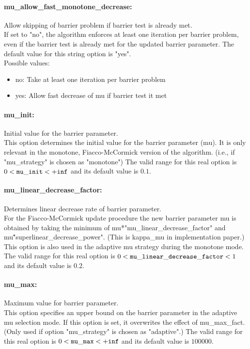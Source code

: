 \paragraph{mu\_allow\_fast\_monotone\_decrease:}\label{sec:mu_allow_fast_monotone_decrease} Allow skipping of barrier problem if barrier test is already met. $\;$ \\
 If set to "no", the algorithm enforces at least
one iteration per barrier problem, even if the
barrier test is already met for the updated
barrier parameter.
The default value for this string option is "yes".
\\ 
Possible values:
\begin{itemize}
   \item no: Take at least one iteration per barrier problem
   \item yes: Allow fast decrease of mu if barrier test it met
\end{itemize}

\paragraph{mu\_init:}\label{sec:mu_init} Initial value for the barrier parameter. $\;$ \\
 This option determines the initial value for the
barrier parameter (mu).  It is only relevant in
the monotone, Fiacco-McCormick version of the
algorithm. (i.e., if "mu\_strategy" is chosen as
"monotone") The valid range for this real option is 
$0 <  {\tt mu\_init } <  {\tt +inf}$
and its default value is $0.1$.


\paragraph{mu\_linear\_decrease\_factor:}\label{sec:mu_linear_decrease_factor} Determines linear decrease rate of barrier parameter. $\;$ \\
 For the Fiacco-McCormick update procedure the new
barrier parameter mu is obtained by taking the
minimum of mu*"mu\_linear\_decrease\_factor" and
mu\^"superlinear\_decrease\_power".  (This is
kappa\_mu in implementation paper.) This option
is also used in the adaptive mu strategy during
the monotone mode. The valid range for this real option is 
$0 <  {\tt mu\_linear\_decrease\_factor } <  1$
and its default value is $0.2$.


\paragraph{mu\_max:}\label{sec:mu_max} Maximum value for barrier parameter. $\;$ \\
 This option specifies an upper bound on the
barrier parameter in the adaptive mu selection
mode.  If this option is set, it overwrites the
effect of mu\_max\_fact. (Only used if option
"mu\_strategy" is chosen as "adaptive".) The valid range for this real option is 
$0 <  {\tt mu\_max } <  {\tt +inf}$
and its default value is $100000$.


